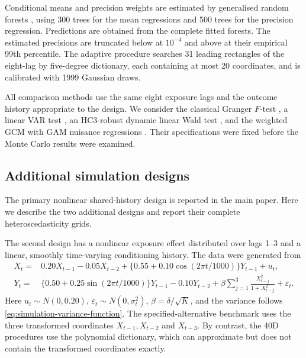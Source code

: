 \documentclass[12pt]{article}
\numberwithin{equation}{section}
\begin{document}
Conditional means and precision weights are estimated by
generalised random forests \citep{athey2019generalized}, using 300 trees for
the mean regressions and 500 trees for the precision regression. Predictions are obtained from the complete fitted forests. The estimated precisions are truncated below at \(10^{-4}\) and above at their empirical 99th percentile. The adaptive procedure searches 31 leading rectangles of the eight-lag by five-degree dictionary, each containing at most 20 coordinates, and is calibrated with 1999 Gaussian draws.

All comparison methods use the same eight exposure lags and the
outcome history appropriate to the design. We consider the classical
Granger \(F\)-test \citep{granger1969investigating}, a linear VAR test
\citep{lutkepohl2005new}, an HC3-robust dynamic linear Wald test
\citep{mackinnon1985some}, and the weighted GCM with GAM nuisance regressions
\citep{scheidegger2022weighted}. Their specifications were fixed before the
Monte Carlo results were examined.

\subsection{Additional simulation designs}
\label{sec:simulation-additional-results}

The primary nonlinear shared-history design is reported in the
main paper. Here we describe the two additional designs and report their
complete heteroscedasticity grids.

\medskip
{}
\label{sec:simulation-nonlinear-lags}

The second design has a nonlinear exposure effect distributed
over lags 1--3 and a linear, smoothly time-varying conditioning history. The
data were generated from
\begin{align}
X_t={}&0.20X_{t-1}-0.05X_{t-2}
+\{0.55+0.10\cos(2\pi t/1000)\}Y_{t-1}+u_t,
\label{eq:sim-nonlinear-x-supp}\\
Y_t={}&\{0.50+0.25\sin(2\pi t/1000)\}Y_{t-1}-0.10Y_{t-2}
+\beta \sum_{j=1}^3\frac{X_{t-j}^2}{1+X_{t-j}^2}+\varepsilon_t.
\label{eq:sim-nonlinear-y-supp}
\end{align}
Here \(u_t\sim N(0,0.20)\),
\(\varepsilon_t\sim N(0,\sigma_t^2)\), \(\beta=\delta/\sqrt K\), and the
variance follows \eqref{eq:simulation-variance-function}. The specified-alternative benchmark uses the three transformed coordinates $X_{t-1}, X_{t-2}$ and $X_{t-3}$. By contrast, the 40D procedures use the polynomial dictionary, which can approximate but does not contain the transformed coordinates exactly.
\end{document}
